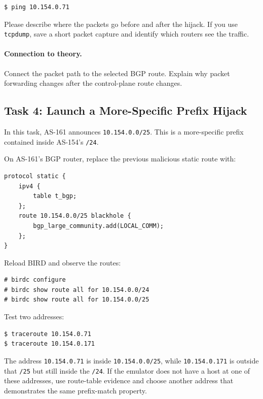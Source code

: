 \begin{lstlisting}
$ ping 10.154.0.71
\end{lstlisting}

Please describe where the packets go before and after the hijack. If you use
\texttt{tcpdump}, save a short packet capture and identify which routers see
the traffic.

\paragraph{Connection to theory.}
Connect the packet path to the selected BGP route. Explain why packet
forwarding changes after the control-plane route changes.


\subsection{Task 4: Launch a More-Specific Prefix Hijack}

In this task, AS-161 announces \texttt{10.154.0.0/25}. This is a
more-specific prefix contained inside AS-154's \texttt{/24}.

On AS-161's BGP router, replace the previous malicious static route with:

\begin{lstlisting}
protocol static {
    ipv4 {
        table t_bgp;
    };
    route 10.154.0.0/25 blackhole {
        bgp_large_community.add(LOCAL_COMM);
    };
}
\end{lstlisting}

Reload BIRD and observe the routes:

\begin{lstlisting}
# birdc configure
# birdc show route all for 10.154.0.0/24
# birdc show route all for 10.154.0.0/25
\end{lstlisting}

Test two addresses:

\begin{lstlisting}
$ traceroute 10.154.0.71
$ traceroute 10.154.0.171
\end{lstlisting}

The address \texttt{10.154.0.71} is inside \texttt{10.154.0.0/25}, while
\texttt{10.154.0.171} is outside that \texttt{/25} but still inside the
\texttt{/24}. If the emulator does not have a host at one of these addresses,
use route-table evidence and choose another address that demonstrates the same
prefix-match property.

